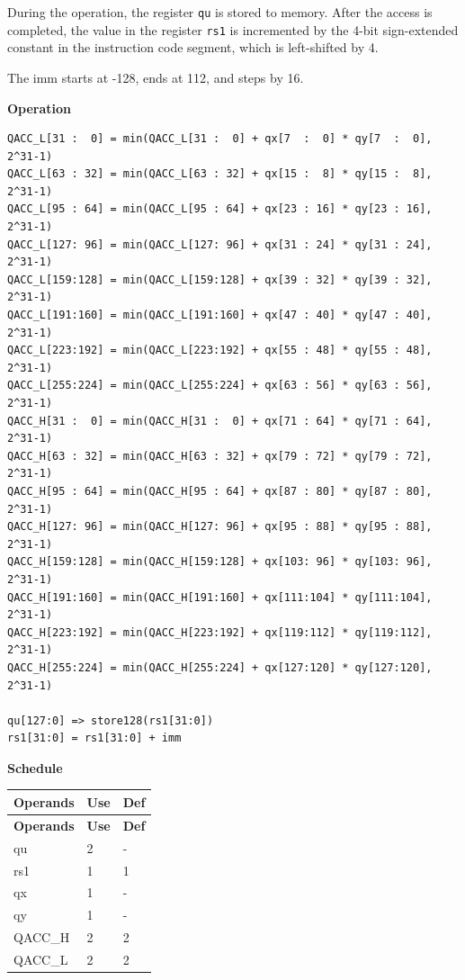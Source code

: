 During the operation, the register \lstinline{qu} is stored to memory. After the access is completed, the value in the register \lstinline{rs1} is incremented by the 4-bit sign-extended constant in the instruction code segment, which is left-shifted by 4.

The imm starts at -128, ends at 112, and steps by 16.

\textbf{Operation}\\

\begin{lstlisting}
QACC_L[31 :  0] = min(QACC_L[31 :  0] + qx[7  :  0] * qy[7  :  0], 2^31-1)
QACC_L[63 : 32] = min(QACC_L[63 : 32] + qx[15 :  8] * qy[15 :  8], 2^31-1)
QACC_L[95 : 64] = min(QACC_L[95 : 64] + qx[23 : 16] * qy[23 : 16], 2^31-1)
QACC_L[127: 96] = min(QACC_L[127: 96] + qx[31 : 24] * qy[31 : 24], 2^31-1)
QACC_L[159:128] = min(QACC_L[159:128] + qx[39 : 32] * qy[39 : 32], 2^31-1)
QACC_L[191:160] = min(QACC_L[191:160] + qx[47 : 40] * qy[47 : 40], 2^31-1)
QACC_L[223:192] = min(QACC_L[223:192] + qx[55 : 48] * qy[55 : 48], 2^31-1)
QACC_L[255:224] = min(QACC_L[255:224] + qx[63 : 56] * qy[63 : 56], 2^31-1)
QACC_H[31 :  0] = min(QACC_H[31 :  0] + qx[71 : 64] * qy[71 : 64], 2^31-1)
QACC_H[63 : 32] = min(QACC_H[63 : 32] + qx[79 : 72] * qy[79 : 72], 2^31-1)
QACC_H[95 : 64] = min(QACC_H[95 : 64] + qx[87 : 80] * qy[87 : 80], 2^31-1)
QACC_H[127: 96] = min(QACC_H[127: 96] + qx[95 : 88] * qy[95 : 88], 2^31-1)
QACC_H[159:128] = min(QACC_H[159:128] + qx[103: 96] * qy[103: 96], 2^31-1)
QACC_H[191:160] = min(QACC_H[191:160] + qx[111:104] * qy[111:104], 2^31-1)
QACC_H[223:192] = min(QACC_H[223:192] + qx[119:112] * qy[119:112], 2^31-1)
QACC_H[255:224] = min(QACC_H[255:224] + qx[127:120] * qy[127:120], 2^31-1)

qu[127:0] => store128(rs1[31:0])
rs1[31:0] = rs1[31:0] + imm
\end{lstlisting}

\textbf{Schedule}\\
\begin{longtable}[c]{|l|l|l|}
    \hline
    \rowcolor{lightgray}
    \textbf{Operands} & \textbf{Use} & \textbf{Def} \\\hline
    \endfirsthead
    \hline
    \rowcolor{lightgray}
     \textbf{Operands} & \textbf{Use} & \textbf{Def} \\\hline
    \endhead
    \hline
    \endfoot

    qu & 2 & - \\\hline
    rs1 & 1 & 1 \\\hline
     qx & 1 & - \\\hline
     qy & 1 & - \\\hline
     QACC\_H & 2 & 2 \\\hline
     QACC\_L & 2 & 2

\end{longtable}

